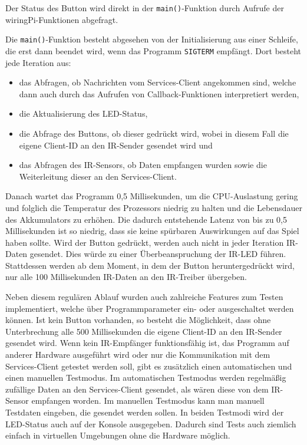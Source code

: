 Der Status des Button wird direkt in der \texttt{main()}-Funktion durch Aufrufe der
wiringPi-Funktionen abgefragt.

Die \texttt{main()}-Funktion besteht abgesehen von der Initialisierung aus einer Schleife, die erst
dann beendet wird, wenn das Programm \texttt{SIGTERM} empfängt.
Dort besteht jede Iteration aus:
\begin{itemize}
  \item
    das Abfragen, ob Nachrichten vom Services-Client angekommen sind, welche dann auch durch das
    Aufrufen von Callback-Funktionen interpretiert werden,
  \item
    die Aktualisierung des LED-Status,
  \item
    die Abfrage des Buttons, ob dieser gedrückt wird, wobei in diesem Fall die eigene Client-ID an
    den IR-Sender gesendet wird und
  \item
    das Abfragen des IR-Sensors, ob Daten empfangen wurden sowie die Weiterleitung dieser an den
    Services-Client.
\end{itemize}
Danach wartet das Programm 0,5 Millisekunden, um die CPU-Auslastung gering und folglich die
Temperatur des Prozessors niedrig zu halten und die Lebensdauer des Akkumulators zu erhöhen.
Die dadurch entstehende Latenz von bis zu 0,5 Millisekunden ist so niedrig, dass sie keine spürbaren
Auswirkungen auf das Spiel haben sollte.
Wird der Button gedrückt, werden auch nicht in jeder Iteration IR-Daten gesendet.
Dies würde zu einer Überbeanspruchung der IR-LED führen.
Stattdessen werden ab dem Moment, in dem der Button heruntergedrückt wird, nur alle 100
Millisekunden IR-Daten an den IR-Treiber übergeben.

Neben diesem regulären Ablauf wurden auch zahlreiche Features zum Testen implementiert, welche über
Programmparameter ein- oder ausgeschaltet werden können.
Ist kein Button vorhanden, so besteht die Möglichkeit, dass ohne Unterbrechung alle 500
Millisekunden die eigene Client-ID an den IR-Sender gesendet wird.
Wenn kein IR-Empfänger funktionsfähig ist, das Programm auf anderer Hardware ausgeführt wird oder
nur die Kommunikation mit dem Services-Client getestet werden soll, gibt es zusätzlich einen
automatischen und einen manuellen Testmodus.
Im automatischen Testmodus werden regelmäßig zufällige Daten an den Services-Client gesendet, als
wären diese von dem IR-Sensor empfangen worden.
Im manuellen Testmodus kann man manuell Testdaten eingeben, die gesendet werden sollen.
In beiden Testmodi wird der LED-Status auch auf der Konsole ausgegeben.
Dadurch sind Tests auch ziemlich einfach in virtuellen Umgebungen ohne die Hardware möglich.

